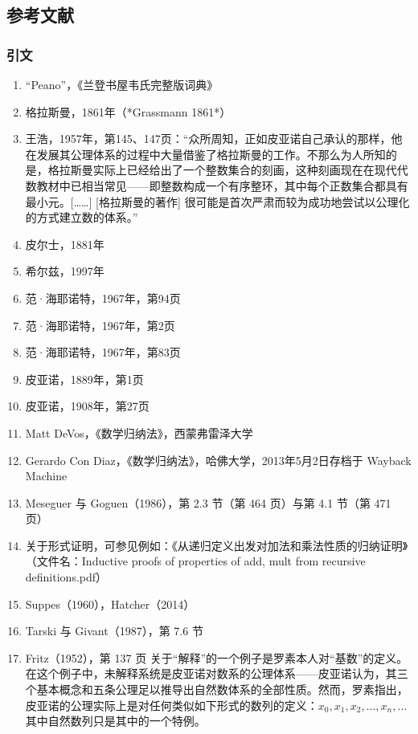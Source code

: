 \subsection{参考文献}
\subsubsection{引文}
\begin{enumerate}
\item “Peano”，《兰登书屋韦氏完整版词典》
\item 格拉斯曼，1861年（*Grassmann 1861*）
\item 王浩，1957年，第145、147页：“众所周知，正如皮亚诺自己承认的那样，他在发展其公理体系的过程中大量借鉴了格拉斯曼的工作。不那么为人所知的是，格拉斯曼实际上已经给出了一个整数集合的刻画，这种刻画现在在现代代数教材中已相当常见——即整数构成一个有序整环，其中每个正数集合都具有最小元。[……] [格拉斯曼的著作] 很可能是首次严肃而较为成功地尝试以公理化的方式建立数的体系。”
\item 皮尔士，1881年
\item 希尔兹，1997年
\item 范·海耶诺特，1967年，第94页
\item 范·海耶诺特，1967年，第2页
\item 范·海耶诺特，1967年，第83页
\item 皮亚诺，1889年，第1页
\item 皮亚诺，1908年，第27页
\item Matt DeVos，《数学归纳法》，西蒙弗雷泽大学
\item Gerardo Con Diaz，《数学归纳法》，哈佛大学，2013年5月2日存档于 Wayback Machine
\item Meseguer 与 Goguen（1986），第 2.3 节（第 464 页）与第 4.1 节（第 471 页）
\item 关于形式证明，可参见例如：《从递归定义出发对加法和乘法性质的归纳证明》（文件名：Inductive proofs of properties of add, mult from recursive definitions.pdf）
\item Suppes（1960），Hatcher（2014）
\item Tarski 与 Givant（1987），第 7.6 节
\item Fritz（1952），第 137 页
关于“解释”的一个例子是罗素本人对“基数”的定义。在这个例子中，未解释系统是皮亚诺对数系的公理体系——皮亚诺认为，其三个基本概念和五条公理足以推导出自然数体系的全部性质。然而，罗素指出，皮亚诺的公理实际上是对任何类似如下形式的数列的定义：$x_0, x_1, x_2, \ldots, x_n, \ldots$其中自然数列只是其中的一个特例。
\end{enumerate}